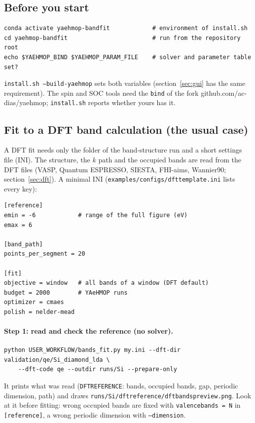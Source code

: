 \documentclass[11pt,a4paper]{article}
\newcommand{\cmd}[1]{\texttt{#1}}
\renewcommand{\_}{\origunderscore\allowbreak}
\begin{document}
\subsection{Before you start}
\begin{lstlisting}[style=sh]
conda activate yaehmop-bandfit            # environment of install.sh
cd yaehmop-bandfit                        # run from the repository root
echo $YAEHMOP_BIND $YAEHMOP_PARAM_FILE    # solver and parameter table set?
\end{lstlisting}
\cmd{install.sh --build-yaehmop} sets both variables (section~\ref{sec:gui} has the same requirement). The spin and SOC tools
need the \cmd{bind} of the fork github.com/ac-dias/yaehmop; \cmd{install.sh} reports whether yours has it.

\subsection{Fit to a DFT band calculation (the usual case)}
A DFT fit needs only the folder of the band-structure run and a short settings file (INI). The structure, the $k$ path and the
occupied bands are read from the DFT files (VASP, Quantum ESPRESSO, SIESTA, FHI-aims, Wannier90;
section~\ref{sec:dft}). A minimal INI (\cmd{examples/configs/dft\_template.ini} lists every key):
\begin{lstlisting}[style=ini]
[reference]
emin = -6            # range of the full figure (eV)
emax = 6

[band_path]
points_per_segment = 20

[fit]
objective = window   # all bands of a window (DFT default)
budget = 2000        # YAeHMOP runs
optimizer = cmaes
polish = nelder-mead
\end{lstlisting}

\paragraph{Step 1: read and check the reference (no solver).}
\begin{lstlisting}[style=sh]
python USER_WORKFLOW/bands_fit.py my.ini --dft-dir validation/qe/Si_diamond_lda \
    --dft-code qe --outdir runs/Si --prepare-only
\end{lstlisting}
It prints what was read (\cmd{DFT\_REFERENCE}: bands, occupied bands, gap, periodic dimension, path) and draws
\cmd{runs/Si/dft\_reference/dft\_bands\_preview.png}. Look at it before fitting: wrong occupied bands are fixed with
\cmd{valence\_bands = N} in \cmd{[reference]}, a wrong periodic dimension with \cmd{--dimension}.
\end{document}
